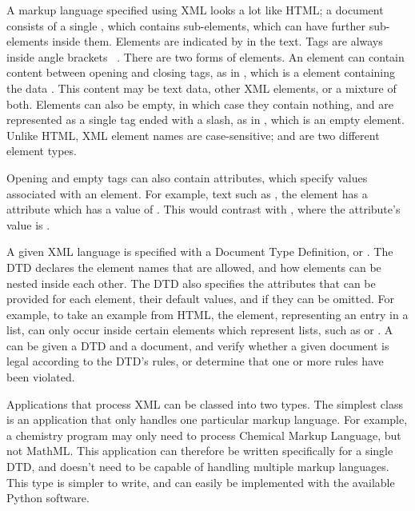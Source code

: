 \documentclass{howto}
\newcommand{\element}[1]{\code{#1}}
\newcommand{\attribute}[1]{\code{#1}}
\begin{document}
A markup language specified using XML looks a lot like HTML; a
document consists of a single , which contains
sub-elements, which can have further sub-elements inside them.
Elements are indicated by  in the text.  Tags are always
inside angle brackets \code{<}~\code{>}.  There are two forms of
elements.  An element can contain content between opening and closing
tags, as in , which is a \element{name}
element containing the data . This content may be text
data, other XML elements, or a mixture of both.  Elements can also be
empty, in which case they contain nothing, and are represented as a
single tag ended with a slash, as in , which is an empty
\element{stop} element.  Unlike HTML, XML element names are
case-sensitive; \element{stop} and \element{Stop} are two different
element types.

Opening and empty tags can also contain attributes, which specify
values associated with an element.  For example, text such as
, the \element{name} element
has a \attribute{lang} attribute which has a value of .
This would contrast with ,
where the attribute's value is .

A given XML language is specified with a Document Type Definition, or
.  The DTD declares the element names that are allowed, and
how elements can be nested inside each other.  The DTD also specifies
the attributes that can be provided for each element, their default
values, and if they can be omitted.  For example, to take an example
from HTML, the \element{LI} element, representing an entry in a list,
can only occur inside certain elements which represent lists, such as
\element{OL} or \element{UL}.  A  can be given
a DTD and a document, and verify whether a given document is legal
according to the DTD's rules, or determine that one or more rules have
been violated.

Applications that process XML can be classed into two types.  The
simplest class is an application that only handles one particular
markup language.  For example, a chemistry program may only need to
process Chemical Markup Language, but not MathML.  This
application can therefore be written specifically for a single DTD,
and doesn't need to be capable of handling multiple markup
languages.  This type is simpler to write, and can easily be
implemented with the available Python software.
\end{document}
